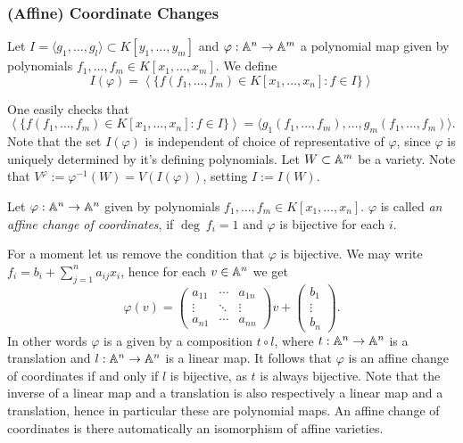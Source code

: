 \subsubsection{(Affine) Coordinate Changes}
\begin{definition}
    Let $I=\langle g_1,\dots,g_l\rangle \subset K[y_1,\dots,y_m]$ and $\varphi : \mathbb{A}^n\rightarrow \mathbb{A}^m$ a polynomial map given by polynomials $f_1,\dots,f_m\in K[x_1,\dots,x_m]$. We define 
    $$I(\varphi) = \left\langle\{ f(f_1,\dots,f_m)\in K[x_1,\dots,x_n] : f\in I\}\right\rangle$$
\end{definition}
\begin{remark}
    One easily checks that 
    $$\left\langle\{ f(f_1,\dots,f_m)\in K[x_1,\dots,x_n] : f\in I\}\right\rangle = \langle g_1(f_1,\dots,f_m),\dots,g_m(f_1,\dots,f_m)\rangle.$$
    Note that the set $I(\varphi)$ is independent of choice of representative of $\varphi$, since $\varphi$ is uniquely determined by it's defining polynomials. Let $W\subset \mathbb{A}^m$ be a variety. Note that $V^\varphi:=\varphi^{-1}(W)=V(I(\varphi))$, setting $I:= I(W)$.  
\end{remark}
\begin{definition}
    Let $\varphi: \mathbb{A}^n\rightarrow \mathbb{A}^n$ given by polynomials $f_1,\dots,f_m\in K[x_1,\dots,x_n]$. $\varphi$ is called \textit{an affine change of coordinates}, if $\deg \ f_i=1$ and $\varphi$ is bijective for each $i$.
\end{definition}
\begin{remark}
    For a moment let us remove the condition that $\varphi$ is bijective. We may write $f_i = b_i + \sum_{j=1}^n a_{ij}x_i$, hence for each $v\in \mathbb{A}^n$ we get
    $$\varphi(v) = \begin{pmatrix}
        a_{11} & \cdots & a_{1n}\\
        \vdots & \ddots & \vdots \\
        a_{n1} & \cdots & a_{nn}
    \end{pmatrix}v+ \begin{pmatrix}
        b_1\\ \vdots \\ b_n
    \end{pmatrix}.$$
    In other words $\varphi$ is a given by a composition $t\circ l$, where $t: \mathbb{A}^n \rightarrow \mathbb{A}^n $ is a translation and $l: \mathbb{A}^n \rightarrow \mathbb{A}^n$ is a linear map. It follows that $\varphi$ is an affine change of coordinates if and only if $l$ is bijective, as $t$ is always bijective. Note that the inverse of a linear map and a translation is also respectively a linear map and a translation, hence in particular these are polynomial maps. An affine change of coordinates is there automatically an isomorphism of affine varieties.  
\end{remark}
